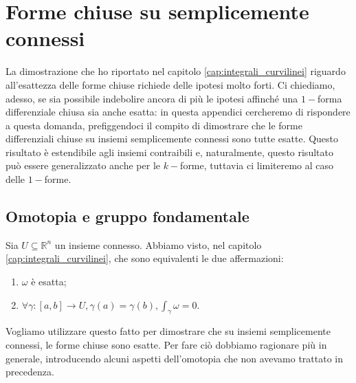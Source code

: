 \chapter{Forme chiuse su semplicemente connessi}
\pagestyle{plain}
\thispagestyle{empty}
\pagestyle{fancy}
%
La dimostrazione che ho riportato nel capitolo \ref{cap:integrali_curvilinei} riguardo all'esattezza delle forme chiuse richiede delle ipotesi molto forti. Ci chiediamo, adesso, se sia possibile indebolire ancora di
più le ipotesi affinché una $1-$forma differenziale chiusa sia anche esatta: in questa appendici cercheremo di rispondere a questa domanda, prefiggendoci il compito di dimostrare che le forme differenziali chiuse su insiemi semplicemente connessi sono tutte esatte. 
Questo risultato è estendibile agli insiemi contraibili e, naturalmente, questo risultato può essere generalizzato anche per le $k-$forme, tuttavia ci limiteremo al caso delle $1-$forme.
\vspace{0.5cm}
\section{Omotopia e gruppo fondamentale}
Sia $U \subseteq \mathbb{R}^n$ un insieme connesso. Abbiamo visto, nel capitolo \ref{cap:integrali_curvilinei}, che sono equivalenti le due affermazioni:
\begin{enumerate}[label=\protect\circled{\arabic*}] 
    \item $\omega$ è esatta;
    \item $\forall \gamma: [a, b] \to U, \gamma(a) = \gamma(b), \int_\gamma \omega = 0$.
\end{enumerate} 
Vogliamo utilizzare questo fatto per dimostrare che su insiemi semplicemente connessi, le forme chiuse sono esatte. Per fare ciò dobbiamo ragionare più in generale, introducendo alcuni aspetti dell'omotopia che
non avevamo trattato in precedenza. 

